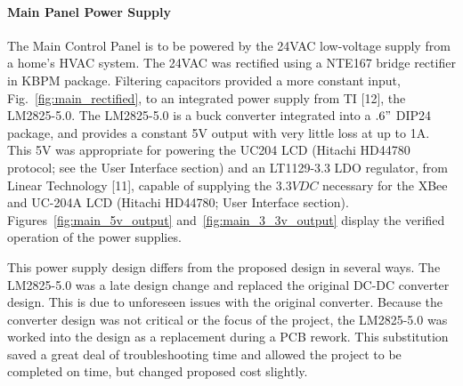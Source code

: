 \paragraph{Main Panel Power Supply}
The Main Control Panel is to be powered by the 24VAC low-voltage supply from a home's HVAC system. The 24VAC was rectified using a NTE167 bridge rectifier in KBPM package.  Filtering capacitors provided a more constant input, Fig.~\ref{fig:main_rectified}, to an integrated power supply from TI [12], the LM2825-5.0.  The LM2825-5.0 is a buck converter integrated into a $.6"$ DIP24 package, and provides a constant 5V output with very little loss at up to 1A.  This 5V was appropriate for powering the UC204 LCD (Hitachi HD44780 protocol; see the User Interface section) and an LT1129-3.3 LDO regulator, from Linear Technology [11], capable of supplying the $3.3VDC$ necessary for the XBee and UC-204A LCD (Hitachi HD44780; User Interface section). Figures~\ref{fig:main_5v_output} and~\ref{fig:main_3_3v_output} display the verified operation of the power supplies.

This power supply design differs from the proposed design in several ways.  The LM2825-5.0 was a late design change and replaced the original DC-DC converter design.  This is due to unforeseen issues with the original converter.  Because the converter design was not critical or the focus of the project, the LM2825-5.0 was worked into the design as a replacement during a PCB rework.  This substitution saved a great deal of troubleshooting time and allowed the project to be completed on time, but changed proposed cost slightly.

